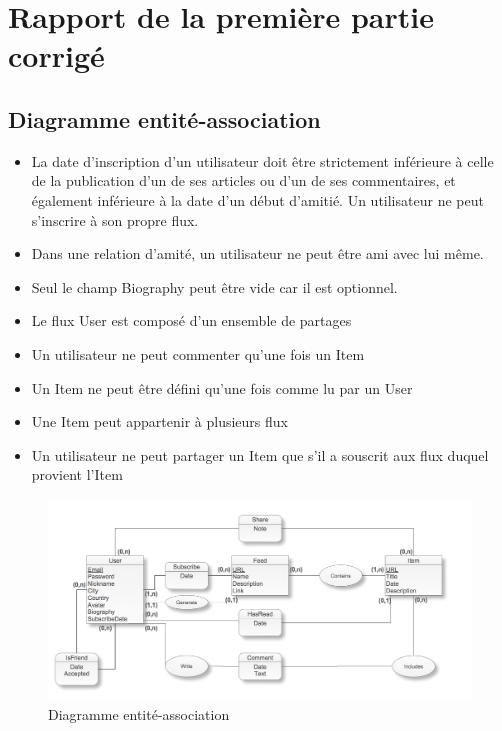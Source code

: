 \documentclass[11pt]{article}
\begin{document}
\section{Rapport de la première partie corrigé}
\subsection{Diagramme entité-association}
\begin{itemize}
\item{La date d'inscription d'un utilisateur doit être strictement inférieure à celle de la publication d'un de ses articles ou d'un de ses commentaires, et également inférieure à la date d'un début d'amitié.
Un utilisateur ne peut s'inscrire à son propre flux.}
\item{Dans une relation d'amité, un utilisateur ne peut être ami avec lui même.}
\item{Seul le champ Biography peut être vide car il est optionnel.}
\item{Le flux User est composé d'un ensemble de partages}
\item{Un utilisateur ne peut commenter qu'une fois un Item}
\item{Un Item ne peut être défini qu'une fois comme lu par un User}
\item{Une Item peut appartenir à plusieurs flux}
\item{Un utilisateur ne peut partager un Item que s'il a souscrit aux flux duquel provient l'Item}
\end{itemize}
\begin{figure}[!ht]
\begin{center}
\includegraphics[width=14cm]{diagram.png}
\end{center}
\caption{Diagramme entité-association}
\label{giagram}
\end{figure}
\end{document}
